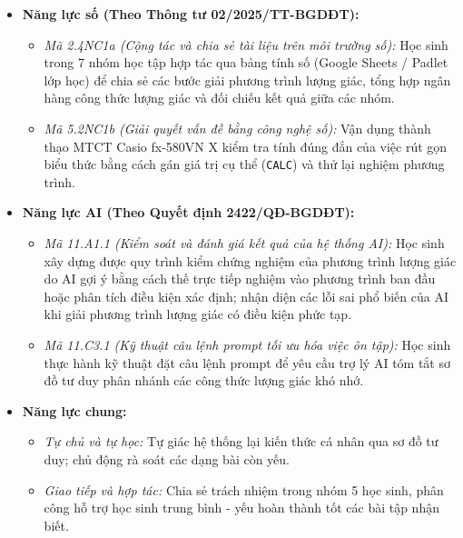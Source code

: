 \documentclass[12pt, a4paper]{article}
\begin{document}
\begin{itemize}[leftmargin=1.2cm]
    \item \textbf{Năng lực số (Theo Thông tư 02/2025/TT-BGDĐT):}  
    \begin{itemize}[leftmargin=0.6cm]  
        \item \textit{Mã 2.4NC1a (Cộng tác và chia sẻ tài liệu trên môi trường số):} Học sinh trong 7 nhóm học tập hợp tác qua bảng tính số (Google Sheets / Padlet lớp học) để chia sẻ các bước giải phương trình lượng giác, tổng hợp ngân hàng công thức lượng giác và đối chiếu kết quả giữa các nhóm.  
        \item \textit{Mã 5.2NC1b (Giải quyết vấn đề bằng công nghệ số):} Vận dụng thành thạo MTCT Casio fx-580VN X kiểm tra tính đúng đắn của việc rút gọn biểu thức bằng cách gán giá trị cụ thể (\texttt{CALC}) và thử lại nghiệm phương trình.  
    \end{itemize}  
  
    \item \textbf{Năng lực AI (Theo Quyết định 2422/QĐ-BGDĐT):}  
    \begin{itemize}[leftmargin=0.6cm]  
        \item \textit{Mã 11.A1.1 (Kiểm soát và đánh giá kết quả của hệ thống AI):} Học sinh xây dựng được quy trình kiểm chứng nghiệm của phương trình lượng giác do AI gợi ý bằng cách thế trực tiếp nghiệm vào phương trình ban đầu hoặc phân tích điều kiện xác định; nhận diện các lỗi sai phổ biến của AI khi giải phương trình lượng giác có điều kiện phức tạp.  
        \item \textit{Mã 11.C3.1 (Kỹ thuật câu lệnh prompt tối ưu hóa việc ôn tập):} Học sinh thực hành kỹ thuật đặt câu lệnh prompt để yêu cầu trợ lý AI tóm tắt sơ đồ tư duy phân nhánh các công thức lượng giác khó nhớ.  
    \end{itemize}  
  
    \item \textbf{Năng lực chung:}  
    \begin{itemize}[leftmargin=0.6cm]  
        \item \textit{Tự chủ và tự học:} Tự giác hệ thống lại kiến thức cá nhân qua sơ đồ tư duy; chủ động rà soát các dạng bài còn yếu.  
        \item \textit{Giao tiếp và hợp tác:} Chia sẻ trách nhiệm trong nhóm 5 học sinh, phân công hỗ trợ học sinh trung bình - yếu hoàn thành tốt các bài tập nhận biết.  
    \end{itemize}  
\end{itemize}  
  
\end{document}
